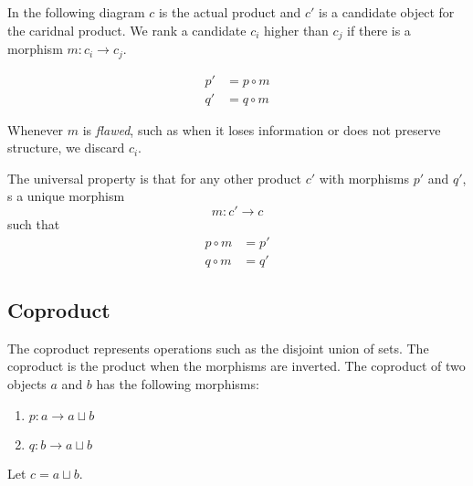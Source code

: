 \documentclass{article}
\begin{document}
In the following diagram \(c\) is the actual product and \(c'\) is a candidate object
for the caridnal product.
We rank a candidate \(c_i\) higher than \(c_j\) if there is a morphism
\(m:c_i \to c_j\).

\begin{minipage}{0.5\textwidth}
\end{minipage}
\begin{minipage}{0.5\textwidth}
    \begin{align*}
        p' &= p \circ m \\
        q' &= q \circ m 
    \end{align*}
\end{minipage}

Whenever \(m\) is \textit{flawed}, such as when it loses information
or does not preserve structure, we discard \(c_i\).

The universal property is that for any other product
\(c'\) with morphisms \(p'\) and \(q'\),
s a unique morphism
\[
    m:c'\to c
\]
such that
\begin{align*}
    p \circ m &= p' \\
    q \circ m &= q'
\end{align*}

\pagebreak

\subsection{Coproduct}

The coproduct represents operations
such as the disjoint union of sets.
The coproduct is the product when the morphisms are inverted.
The coproduct of two objects \(a\) and \(b\) has the following
morphisms:
\begin{enumerate}
    \item \(p:a \to a\sqcup b\)
    \item \(q:b \to a\sqcup b\)
\end{enumerate}

Let \(c=a\sqcup b\).
\end{document}
